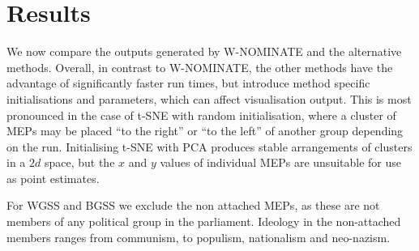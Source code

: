 \documentclass{llncs}
\begin{document}



\section{Results}
\label{sec:results}

We now compare the outputs generated by  W-NOMINATE and the alternative methods. Overall, in contrast to W-NOMINATE, the other methods have the advantage of significantly faster run times, but introduce method specific initialisations and parameters, which can affect visualisation output. This is most pronounced in the case of t-SNE with random initialisation, where a cluster of MEPs may be placed ``to the right'' or ``to the left'' of another group depending on the run. Initialising t-SNE with PCA produces stable arrangements of clusters in a $2d$ space, but the $x$ and $y$ values of individual MEPs are unsuitable for use as point estimates.

For WGSS and BGSS we exclude the non attached MEPs, as these are not members of any political group in the parliament. Ideology in the non-attached members ranges from communism, to populism, nationalism and neo-nazism.
\end{document}

